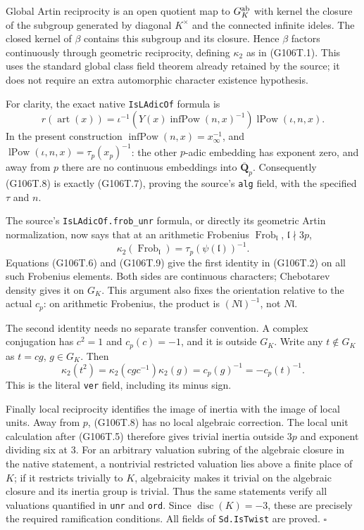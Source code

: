 Global Artin reciprocity is an open quotient map to \(G_K^{\rm ab}\)
with kernel the closure of the subgroup generated by diagonal
\(K^\times\) and the connected infinite ideles.  The closed kernel
of \(\beta\) contains this subgroup and its closure.  Hence \(\beta\)
factors continuously through geometric reciprocity, defining
\(\kappa_2\) as in (G106T.1).  This uses the standard global class field
theorem already retained by the source; it does not require an extra
automorphic character existence hypothesis.

For clarity, the exact native \texttt{IsLAdicOf} formula is
\[
 r(\operatorname{art}(x))
 =\iota^{-1}\!\left(Y(x)\operatorname{infPow}(n,x)^{-1}\right)
     \operatorname{lPow}(\iota,n,x).
 \tag{G106T.8}
\]
In the present construction \(\operatorname{infPow}(n,x)=x_\infty^{-1}\),
and \(\operatorname{lPow}(\iota,n,x)=\tau_p(x_p)^{-1}\): the other
\(p\)-adic embedding has exponent zero, and away from \(p\) there
are no continuous embeddings into \(\overline{\mathbf Q}_p\).
Consequently (G106T.8) is exactly (G106T.7), proving the source's
\texttt{alg} field, with the specified \(\tau\) and \(n\).

The source's \texttt{IsLAdicOf.frob\_unr} formula, or directly its
geometric Artin normalization, now says that at an arithmetic
Frobenius \(\operatorname{Frob}_{\mathfrak l}\), \(\mathfrak l\nmid3p\),
\[
 \kappa_2(\operatorname{Frob}_{\mathfrak l})
       =\tau_p(\psi(\mathfrak l))^{-1}.
 \tag{G106T.9}
\]
Equations (G106T.6) and (G106T.9) give the first identity in (G106T.2)
on all such Frobenius elements.  Both sides are continuous characters;
Chebotarev density gives it on \(G_K\).  This argument also fixes the
orientation relative to the actual \(c_p\): on arithmetic Frobenius,
the product is \((N\mathfrak l)^{-1}\), not \(N\mathfrak l\).

The second identity needs no separate transfer convention.  A complex
conjugation has \(c^2=1\) and \(c_p(c)=-1\), and it is outside \(G_K\).
Write any \(t\notin G_K\) as \(t=cg\), \(g\in G_K\).  Then
\[
 \kappa_2(t^2)=\kappa_2(cgc^{-1})\kappa_2(g)
 =c_p(g)^{-1}=-c_p(t)^{-1}.
 \tag{G106T.10}
\]
This is the literal \texttt{ver} field, including its minus sign.

Finally local reciprocity identifies the image of inertia with the
image of local units.  Away from \(p\), (G106T.8) has no local
algebraic correction.  The local unit calculation after (G106T.5)
therefore gives trivial inertia outside \(3p\) and exponent dividing
six at \(3\).  For an arbitrary valuation subring of the algebraic
closure in the native statement, a nontrivial restricted valuation
lies above a finite place of \(K\); if it restricts trivially to
\(K\), algebraicity makes it trivial on the algebraic closure and
its inertia group is trivial.  Thus the same statements verify all
valuations quantified in \texttt{unr} and \texttt{ord}.  Since
\(\operatorname{disc}(K)=-3\), these are precisely the required
ramification conditions.  All fields of \texttt{Sd.IsTwist} are proved.
\hfill\(\square\)

